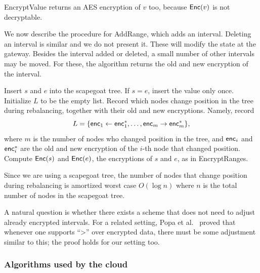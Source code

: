EncryptValue returns an AES encryption of $v$ too, because $\mathsf{Enc}(v)$ is not decryptable. 

We now describe the procedure for AddRange, which adds an interval. Deleting an interval is similar and we do
not present it.
These will modify the state at the gateway. Besides the interval added or deleted, a small number
of other intervals may be moved. For these, the algorithm returns the old and new encryption of the interval. 


\begin{framed}
\begin{algorithmic}[1]

  \State Insert $s$ and $e$ into the scapegoat tree. If $s=e$, insert the value only once.
  \State Initialize $L$ to be the empty list.
  	\State Record which nodes change position in the tree during rebalancing, together with 
	their old and new encryptions. Namely, record	\[L = \{ \mathsf{enc}_1 \leftarrow \mathsf{enc}^*_1, \dots, \mathsf{enc}_m \rightarrow \mathsf{enc}^*_m\},\] where $m$ is the number of nodes who changed position in the tree, and $\mathsf{enc}_i$ and $\mathsf{enc}^*_i$ are the old and new encryption of the $i$-th node that changed position. 
  \EndIf
  \State Compute  $\mathsf{Enc}(s)$ and $\mathsf{Enc}(e)$, the encryptions of $s$ and $e$, as in EncryptRanges.
   \State {}
\EndProcedure

\end{algorithmic}
\end{framed}


Since we are using a scapegoat tree, the number of nodes that change position during rebalancing is amortized worst case $O(\log n)$ where $n$ is the total number of nodes in the scapegoat tree. 

A natural question is whether there exists a scheme that does not need to adjust already encrypted intervals. For a related setting, Popa et al.~\cite{popa:mope} proved that whenever one supports ``>'' over  encrypted data, there must be some adjustment similar to this; the proof holds for our setting too.  


\subsubsection{Algorithms used by the cloud}

